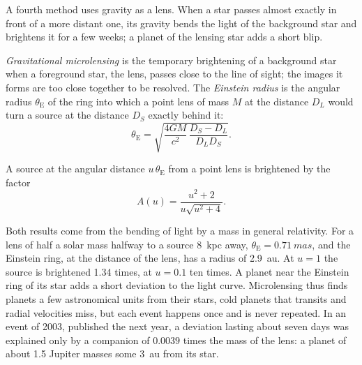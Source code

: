 A fourth method uses gravity as a lens. When a star passes almost exactly
in front of a more distant one, its gravity bends the light of the
background star and brightens it for a few weeks; a planet of the lensing
star adds a short blip.

\begin{definition}\label{def:b3:exoplanets:microlensing}
\emph{Gravitational microlensing} is the
temporary brightening of a background star when a foreground star, the
lens, passes close to the line of sight; the images it forms are too close
together to be resolved. The \emph{Einstein radius}
is the angular radius $\theta_\mathrm E$ of the ring into which a point
lens of mass $M$ at the distance $D_L$ would turn a source at the
distance $D_S$ exactly behind it:
\[
\theta_\mathrm E = \sqrt{\frac{4GM}{c^2}\,\frac{D_S - D_L}{D_L D_S}} .
\]
\end{definition}

\begin{proposition}\label{prop:b3:exoplanets:magnification}
A source at the angular distance $u\,\theta_\mathrm E$ from a point lens
is brightened by the factor
\[
A(u) = \frac{u^2 + 2}{u\sqrt{u^2 + 4}} .
\]
\end{proposition}

\admitted

Both results come from the bending of light by a mass in general
relativity. For a lens of half a solar mass halfway to a source
\qty{8}{kpc} away, $\theta_\mathrm E = \qty{0.71}{mas}$, and the Einstein
ring, at the distance of the lens, has a radius of \qty{2.9}{au}. At
$u = 1$ the source is brightened 1.34 times, at $u = 0.1$ ten times. A
planet near the Einstein ring of its star adds a short deviation to the
light curve. Microlensing thus finds planets a few astronomical units
from their stars, cold planets that transits and radial velocities miss,
but each event happens once and is never repeated. In an event of 2003,
published the next year, a deviation lasting about seven days was
explained only by a companion of $\num{0.0039}$ times the mass of the
lens: a planet of about 1.5 Jupiter masses some \qty{3}{au} from its
star.


